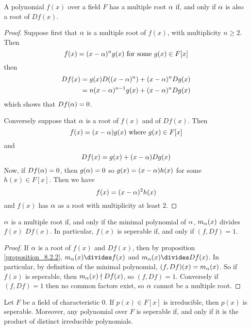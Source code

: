 \begin{proposition}\label{proposition_8.6.2}
  A polynomial $f(x)$ over a field $F$ has a multiple root $\alpha$ if,
  and only if $\alpha$ is also a root of $D{f(x)}$.
\end{proposition}
\begin{proof}
  Suppose first that $\alpha$ is a multiple root of $f(x)$, with
  multiplicity $n \geq 2$. Then
  \begin{equation*}
    f(x)=(x-\alpha)^ng(x) \text{ for some } g(x) \in F[x]
  \end{equation*}
  then
  \begin{align*}
    D{f(x)} &= g(x)D{((x-\alpha)^n)}+(x-\alpha)^nD{g(x)} \\
      &= n(x-\alpha)^{n-1}g(x)+(x-\alpha)^nD{g(x)} \\
  \end{align*}
  which shows that $D{f(\alpha)}=0$.

  Conversely suppose that $\alpha$ is a root of $f(x)$ and of $D{f(x)}$.
  Then
  \begin{equation*}
    f(x)=(x-\alpha)g(x) \text{ where } g(x) \in F[x]
  \end{equation*}
  and
  \begin{equation*}
    D{f(x)}=g(x)+(x-\alpha)D{g(x)}
  \end{equation*}
  Now, if $D{f(\alpha)}=0$, then $g(\alpha)=0$ so $g(x)=(x-\alpha)h(x)$ for some
  $h(x) \in F[x]$. Then we have
  \begin{equation*}
    f(x)=(x-\alpha)^2h(x)
  \end{equation*}
  and $f(x)$ has $\alpha$ as a root with multiplicity at least $2$.
\end{proof}
\begin{corollary}
  $\alpha$ is a multiple root if, and only if the minimal polynomial of
  $\alpha$, $m_\alpha(x)$ divides $f(x)$ $D{f(x)}$. In particular, $f(x)$ is
  seperable if, and only if $(f,D{f})=1$.
\end{corollary}
\begin{proof}
  If $\alpha$ is a root of $f(x)$ and $D{f(x)}$, then by proposition
  \ref{proposition_8.2.2}, $m_\a(x) \divides f(x)$ and $m_\a(x)
  \divides D{f(x)}$. In particular, by definition of the minimal
  polynomial, $(f,D{f})(x)=m_\alpha(x)$. So if $f(x)$ is seperable, then
  $m_\alpha(x) \nmid D{f(x)}$, so $(f,D{f})=1$. Conversely if
  $(f,D{f})=1$ then  no common factors exist, so $\alpha$ cannot be a
  multiple root.
\end{proof}
\begin{corollary}
  Let $F$ be a field of characteristic $0$. If $p(x) \in
  F[x]$ is irreducible, then $p(x)$ is seperable. Moreover, any
  polynomial over $F$ is seperable if, and only if it is the product
  of distinct irreducible polynomials.
\end{corollary}
